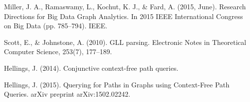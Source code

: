 \documentclass{sig-alternate} %
\begin{document}
\begin{thebibliography}{9}
  
Miller, J. A., Ramaswamy, L., Kochut, K. J., \& Fard, A. (2015, June). Research Directions for Big Data Graph Analytics. In 2015 IEEE International Congress on Big Data (pp. 785--794). IEEE.

Scott, E., \& Johnstone, A. (2010). GLL parsing. Electronic Notes in Theoretical Computer Science, 253(7), 177--189.

Hellings, J. (2014). Conjunctive context-free path queries.

Hellings, J. (2015). Querying for Paths in Graphs using Context-Free Path Queries. arXiv preprint 
arXiv:1502.02242.


\end{thebibliography}
\end{document}
